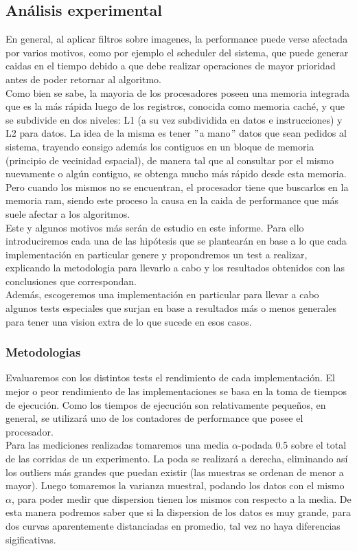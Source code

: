 \subsection{Análisis experimental}

En general, al aplicar filtros sobre imagenes, la performance puede verse afectada por varios motivos, como por ejemplo el scheduler del sistema, que puede generar caidas en el tiempo debido a que debe realizar operaciones de mayor prioridad antes de poder retornar al algoritmo.\\

Como bien se sabe, la mayoria de los procesadores poseen una memoria integrada que es la más rápida luego de los registros, conocida como memoria caché, y que se subdivide en dos niveles: L1 (a su vez subdividida en datos e instrucciones) y L2 para datos. 
La idea de la misma es tener $"$a mano$"$ datos que sean pedidos al sistema, trayendo consigo además los contiguos en un bloque de memoria (principio de vecinidad espacial), de manera tal que al consultar por el mismo nuevamente o algún contiguo, se obtenga mucho más rápido desde esta memoria. Pero cuando los mismos no se encuentran, el procesador tiene que buscarlos en la memoria ram, siendo este proceso la causa en la caida de performance que más suele afectar a los algoritmos.\\ 

Este y algunos motivos más serán de estudio en este informe. Para ello introduciremos cada una de las hipótesis que se plantearán en base a lo que cada implementación en particular genere y propondremos un test a realizar, explicando la metodologia para llevarlo a cabo y los resultados obtenidos con las conclusiones que correspondan.\\
 
Además, escogeremos una implementación en particular para llevar a cabo algunos tests especiales que surjan en base a resultados más o menos generales para tener una vision extra de lo que sucede en esos casos.\\

\subsubsection{Metodologias}

Evaluaremos con los distintos tests el rendimiento de cada implementación. El mejor o peor rendimiento de las implementaciones se basa en la toma de tiempos de ejecución. Como los tiempos de ejecución son relativamente pequeños, en general, se utilizará uno de los contadores de performance que posee el procesador. \\
Para las mediciones realizadas tomaremos una media $\alpha$-podada 0.5 sobre el total de las corridas de un experimento. La poda se realizará a derecha, eliminando así los outliers más grandes que puedan existir (las muestras se ordenan de menor a mayor). Luego tomaremos la varianza muestral, podando los datos con el mismo $\alpha$, para poder medir que dispersion tienen los mismos con respecto a la media. 
De esta manera podremos saber que si la dispersion de los datos es muy grande, para dos curvas aparentemente distanciadas en promedio, tal vez no haya diferencias sigificativas.

